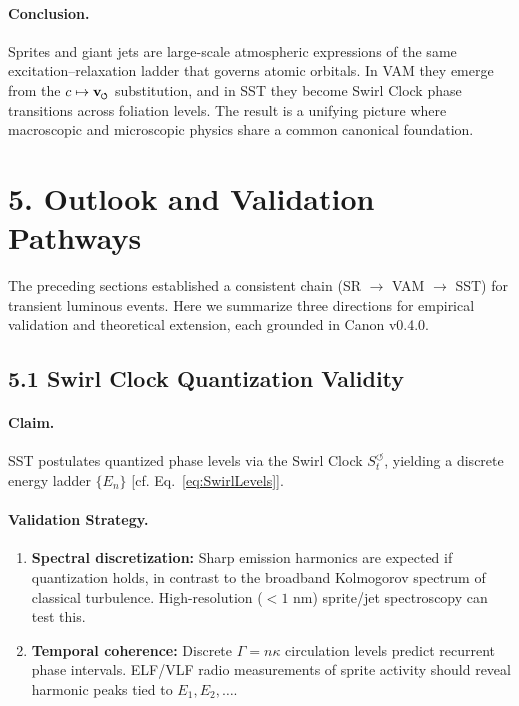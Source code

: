 \documentclass[reprint,aps,onecolumn,nofootinbib]{revtex4-2}
\newcommand{\swirlarrow}{%
    \mathchoice{\mkern-2mu\scriptstyle\boldsymbol{\circlearrowleft}}%
    {\mkern-2mu\scriptstyle\boldsymbol{\circlearrowleft}}%
    {\mkern-2mu\scriptscriptstyle\boldsymbol{\circlearrowleft}}%
    {\mkern-2mu\scriptscriptstyle\boldsymbol{\circlearrowleft}}%
}
\newcommand{\vswirl}{\mathbf{v}_{\swirlarrow}}
\newcommand{\Ce}{\vswirl}
\begin{document}
    \paragraph{Conclusion.}
        Sprites and giant jets are large-scale atmospheric expressions
        of the same excitation--relaxation ladder that governs atomic
        orbitals. In VAM they emerge from the $c\mapsto \Ce$ substitution,
        and in SST they become Swirl Clock phase transitions across
        foliation levels. The result is a unifying picture where
        macroscopic and microscopic physics share a common canonical
        foundation.


\section*{5. Outlook and Validation Pathways}

The preceding sections established a consistent chain
(SR $\to$ VAM $\to$ SST) for transient luminous events.
Here we summarize three directions for empirical validation
and theoretical extension, each grounded in Canon v0.4.0.

\subsection*{5.1 Swirl Clock Quantization Validity}

    \paragraph{Claim.}
        SST postulates quantized phase levels via the Swirl Clock
        $S_t^{\boldsymbol{\circlearrowleft}}$, yielding a discrete energy ladder
        $\{E_n\}$ [cf. Eq.~\eqref{eq:SwirlLevels}].

    \paragraph{Validation Strategy.}
        \begin{enumerate}
        \item \textbf{Spectral discretization:}
        Sharp emission harmonics are expected if quantization holds, in contrast
        to the broadband Kolmogorov spectrum of classical turbulence.
        High-resolution ($<1$ nm) sprite/jet spectroscopy can test this.

        \item \textbf{Temporal coherence:}
        Discrete $\Gamma = n\kappa$ circulation levels predict recurrent
        phase intervals. ELF/VLF radio measurements of sprite activity
        should reveal harmonic peaks tied to $E_1, E_2, \dots$.
        \end{enumerate}
\end{document}
